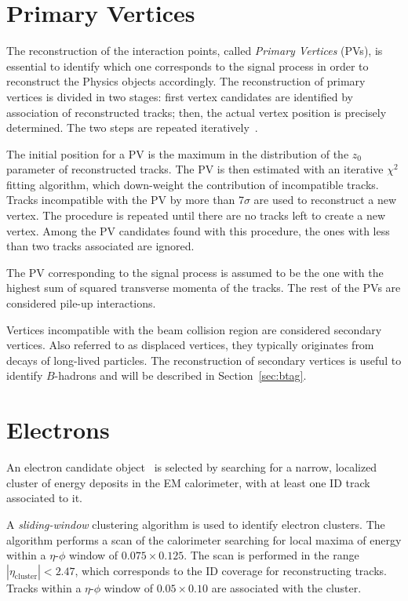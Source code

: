 \section{Primary Vertices}
\label{sec:pv}

The reconstruction of the interaction points, called {\it Primary
  Vertices} (PVs), is essential to identify which one corresponds to the signal
process in order to reconstruct the Physics objects accordingly.
The reconstruction of primary vertices is divided in two stages: first
vertex candidates are identified by association of reconstructed
tracks; then, the actual vertex position is precisely determined.
The two steps are repeated iteratively~\cite{vertexalgo}.

The initial position for a PV is the maximum in the distribution of
the $z_0$ parameter of reconstructed tracks. The PV is then
estimated with an iterative $\chi^2$ fitting algorithm, which
down-weight the contribution of incompatible tracks. Tracks
incompatible with the PV by more than 7$\sigma$ are used to
reconstruct a new vertex. The procedure is repeated until there are no
tracks left to create a new vertex. Among the PV candidates found with
this procedure, the ones with less than two tracks associated are ignored. 

The PV corresponding to the signal process is assumed to be the one with
the highest sum of squared transverse momenta of the tracks. The rest
of the PVs are considered pile-up interactions.

Vertices incompatible with the beam collision region are considered
secondary vertices.
Also referred to as displaced vertices, they typically originates from
decays of long-lived particles.
The reconstruction of secondary vertices is useful to identify
$B$-hadrons and will be described in Section~\ref{sec:btag}.

\section{Electrons}
\label{sec:electrons}

An electron candidate object~\cite{elereco} is selected by searching 
for a narrow, 
localized cluster of energy deposits in the EM calorimeter, 
with at least one ID track associated to it.

A {\it sliding-window} clustering algorithm is used to identify electron 
clusters. The algorithm performs a scan of the calorimeter searching 
for local maxima of energy
within a $\eta$-$\phi$ window of $0.075\times{}0.125$.
The scan is performed in the range $|\eta_{\mathrm{cluster}}|<2.47$, 
which corresponds to the ID coverage for reconstructing tracks. 
Tracks within a $\eta$-$\phi$ window of $0.05\times{}0.10$ are 
associated with the cluster.

